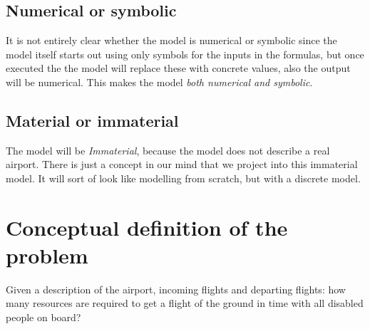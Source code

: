 \documentclass[a4paper, 11pt, notitlepage]{report}
\begin{document}
\subsection{Numerical or symbolic}
It is not entirely clear whether the model is numerical or symbolic since the model itself starts out using only symbols for the inputs in the formulas, but once executed the the model will replace these with concrete values, also the output will be numerical. This makes the model \emph{both numerical and symbolic}.
\subsection{Material or immaterial}
The model will be \emph{Immaterial}, because the model does not describe a real airport. There is just a concept in our mind that we project into this immaterial model. It will sort of look like modelling from scratch, but with a discrete model.
\section{Conceptual definition of the problem}
Given a description of the airport, incoming flights and departing flights: how many resources are required to get a flight of the ground in time with all disabled people on board?
\end{document}
